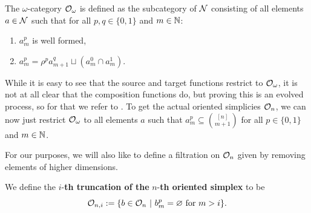 \documentclass{article}
\begin{document}
\begin{defn}
    The $\omega$-category $\mathcal{O}_\omega$ is defined as the subcategory of $\mathcal{N}$ consisting of all elements $a\in\mathcal{N}$ such that for all $p,q\in\{0,1\}$ and $m\in\mathbb{N}$:
    \begin{enumerate}
        \item $a_m^p$ is well formed,
        \item $a_m^p=\rho^pa_{m+1}^q\sqcup (a_m^0\cap a_m^1)$.
    \end{enumerate}
\end{defn}

While it is easy to see that the source and target functions restrict to $\mathcal{O}_\omega$, it is not at all clear that the composition functions do, but proving this is an evolved process, so for that we refer to \cite{Street}. To get the actual oriented simplicies $\mathcal{O}_n$, we can now just restrict $\mathcal{O}_\omega$ to all elements $a$ such that $a_m^p\subseteq{\binom{[n]}{m+1}}$ for all $p\in\{0,1\}$ and $m\in\mathbb{N}$.

For our purposes, we will also like to define a filtration on $\mathcal{O}_n$ given by removing elements of higher dimensions.

\begin{defn}
    We define the $i$-\textbf{th truncation of the} $n$-\textbf{th oriented simplex} to be
    $$ \mathcal{O}_{n,i}:=\{b\in\mathcal{O}_n\ |\ b^p_m=\varnothing\text{ for }m>i\}. $$
\end{defn}
\end{document}
